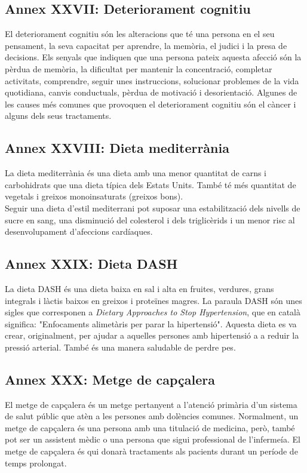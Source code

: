 \documentclass[a4paper,12pt]{article}
\begin{document}
\subsection*{Annex XXVII: Deteriorament cognitiu}
El deteriorament cognitiu són les alteracions que té una persona en el seu pensament, la seva capacitat per aprendre, la memòria, el judici i la presa de decisions. Els senyals que indiquen que una persona pateix aquesta afecció són la pèrdua de memòria, la dificultat per mantenir la concentració, completar activitats, comprendre, seguir unes instruccions, solucionar problemes de la vida quotidiana, canvis conductuals, pèrdua de motivació i desorientació. Algunes de les causes més comunes que provoquen el deteriorament cognitiu són el càncer i alguns dels seus tractaments.
\subsection*{Annex XXVIII: Dieta mediterrània}
La dieta mediterrània és una dieta amb una menor quantitat de carns i carbohidrats que una dieta típica dels Estats Units. També té més quantitat de vegetals i greixos monoinsaturats (greixos bons).\\
Seguir una dieta d'estil mediterrani pot suposar una estabilització dels nivells de sucre en sang, una disminució del colesterol i dels triglicèrids i un menor risc al desenvolupament d'afeccions cardíaques.
\subsection*{Annex XXIX: Dieta DASH}
La dieta DASH és una dieta baixa en sal i alta en fruites, verdures, grans integrals i làctis baixos en greixos i proteïnes magres. La paraula DASH són unes sigles que corresponen a \textit{Dietary Approaches to Stop Hypertension}, que en català significa: "Enfocaments alimetàris per parar la hipertensió". Aquesta dieta es va crear, originalment, per ajudar a aquelles persones amb hipertensió a a reduir la pressió arterial. També és una manera saludable de perdre pes.
\subsection*{Annex XXX: Metge de capçalera}
El metge de capçalera és un metge pertanyent a l'atenció primària d'un sistema de salut públic que atèn a les persones amb dolències comunes. Normalment, un metge de capçalera és una persona amb una titulació de medicina, però, també pot ser un assistent mèdic o una persona que sigui professional de l'infermeía. El metge de capçalera és qui donarà tractaments als pacients durant un període de temps prolongat.
\end{document}
